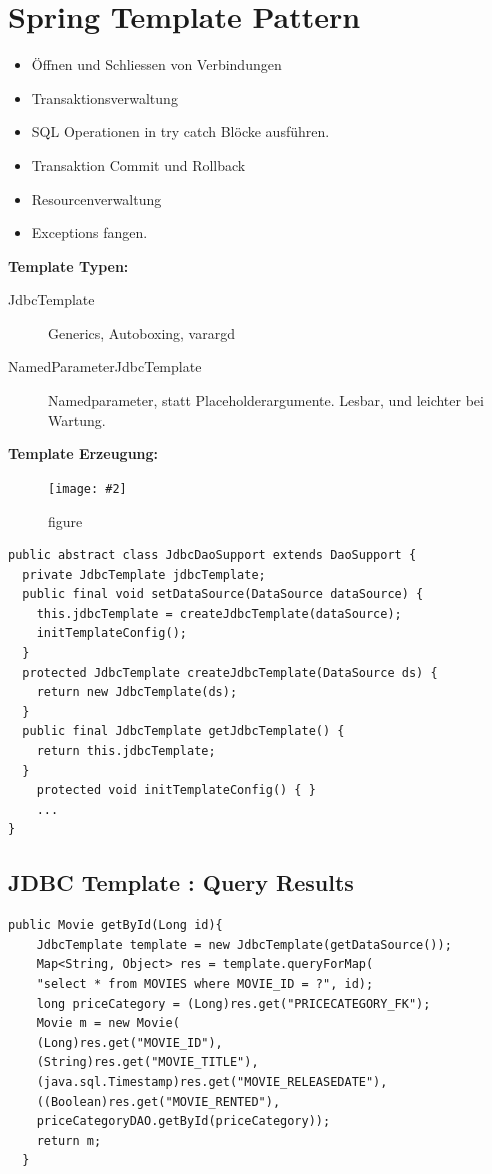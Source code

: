 \documentclass[a4paper,10pt]{scrreprt}
\newcommand{\pic}[2][figure]{\begin{figure}[h]
 \centering
 \texttt{[image: \#2]}
 \caption{#1}
\end{figure}
}
\begin{document}
\section{Spring Template Pattern}
\begin{itemize}
 \item Öffnen und Schliessen von Verbindungen
 \item Transaktionsverwaltung
 \item SQL Operationen in try catch Blöcke ausführen.
 \item Transaktion Commit und Rollback
 \item Resourcenverwaltung
 \item Exceptions fangen.
\end{itemize}

\textbf{Template Typen:}
\begin{description}
 \item [JdbcTemplate] Generics, Autoboxing, varargd
 \item [NamedParameterJdbcTemplate] Namedparameter, statt Placeholderargumente. Lesbar, und leichter bei Wartung.
\end{description}

\textbf{Template Erzeugung:}
\pic{jdbc.png}

\begin{lstlisting}[caption=JdbcDaoSupport]
public abstract class JdbcDaoSupport extends DaoSupport {
  private JdbcTemplate jdbcTemplate;
  public final void setDataSource(DataSource dataSource) {
    this.jdbcTemplate = createJdbcTemplate(dataSource);
    initTemplateConfig();
  }
  protected JdbcTemplate createJdbcTemplate(DataSource ds) {
    return new JdbcTemplate(ds);
  }
  public final JdbcTemplate getJdbcTemplate() {
    return this.jdbcTemplate;
  }
    protected void initTemplateConfig() { }
    ...
}
\end{lstlisting}

\subsection{JDBC Template : Query Results}
\begin{lstlisting}[caption=JDBC Query Results]
 public Movie getById(Long id){
    JdbcTemplate template = new JdbcTemplate(getDataSource());
    Map<String, Object> res = template.queryForMap(
    "select * from MOVIES where MOVIE_ID = ?", id);
    long priceCategory = (Long)res.get("PRICECATEGORY_FK");
    Movie m = new Movie(
    (Long)res.get("MOVIE_ID"),
    (String)res.get("MOVIE_TITLE"),
    (java.sql.Timestamp)res.get("MOVIE_RELEASEDATE"),
    ((Boolean)res.get("MOVIE_RENTED"),
    priceCategoryDAO.getById(priceCategory));
    return m;
  }
\end{lstlisting}
\end{document}
